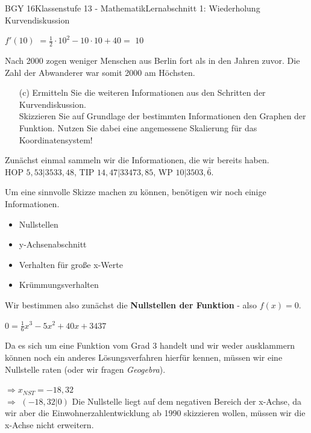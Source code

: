 \documentclass[oneside,openany,headings=optiontotoc,11pt,numbers=noenddot]{scrreprt}
\begin{document}
\begin{worksheet}{BGY 16}{Klassenstufe 13 - Mathematik}{Lernabschnitt 1: Wiederholung Kurvendiskussion}
\begin{framed}
			\colorbox{green!10}{\(f'(10)\)} \(= \frac{1}{2}\cdot{}10^2 -10\cdot{}10 +40 =\) \colorbox{green!10}{\(10\)}\\
			\par\bigskip\noindent
			Nach 2000 zogen weniger Menschen aus Berlin fort als in den Jahren zuvor. Die Zahl der \grqq{}Abwanderer\grqq{} war somit 2000 am Höchsten.
		\end{framed}
		\newpage
		\begin{itemize}
			\item[(c)] Ermitteln Sie die weiteren Informationen aus den Schritten der Kurvendiskussion.\\
			Skizzieren Sie auf Grundlage der bestimmten Informationen den Graphen der Funktion. Nutzen Sie dabei eine angemessene Skalierung für das Koordinatensystem!
		\end{itemize}
		\begin{framed}
			\noindent
			Zunächst einmal sammeln wir die Informationen, die wir bereits haben.\\
			\colorbox{green!10}{HOP \(5,53|3533,48\)}, \colorbox{green!10}{TIP \(14,47|33473,85\)}, \colorbox{green!10}{WP \(10|3503,\bar{6}\)}.\\
			\par\noindent
			Um eine sinnvolle Skizze machen zu können, benötigen wir noch einige Informationen.
			\begin{itemize}
				\item Nullstellen
				\item y-Achsenabschnitt
				\item Verhalten für große x-Werte
				\item Krümmungsverhalten
			\end{itemize}
			Wir bestimmen also zunächst die \textbf{Nullstellen der Funktion} - also \(f(x) = 0\).\\
			\par\noindent
			\(0 = \frac{1}{6}x^3 -5x^2 +40x + 3437\)\\
			\par\noindent
			Da es sich um eine Funktion vom Grad 3 handelt und wir weder ausklammern können noch ein anderes Lösungsverfahren hierfür kennen, müssen wir eine Nullstelle raten (oder wir fragen \textit{Geogebra}).\\
			\par\noindent
			\(\Rightarrow x_{NST} = -18,32\)\\
			\(\Rightarrow\) \colorbox{green!10}{\((-18,32|0)\)}
			Die Nullstelle liegt auf dem negativen Bereich der x-Achse, da wir aber die Einwohnerzahlentwicklung ab 1990 skizzieren wollen, müssen wir die x-Achse nicht erweitern.\\

\end{framed}
\end{worksheet}
\end{document}
